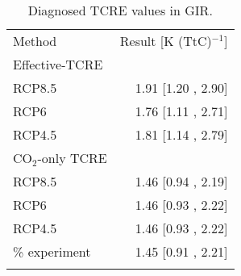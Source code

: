 \documentclass[gmd, manuscript]{copernicus}
\begin{document}
\begin{table}[t]
    \caption{Diagnosed TCRE values in GIR.} \label{tab:TCREresults}
    \begin{tabular}{l r}
    \tophline
        Method & Result [K (TtC)$^{-1}$]\\
    \middlehline
        Effective-TCRE & \\
        RCP8.5 & 1.91 [1.20 , 2.90]\\
        RCP6 & 1.76 [1.11 , 2.71]\\
        RCP4.5 & 1.81 [1.14 , 2.79]\\
    \middlehline
        CO$_2$-only TCRE & \\
        RCP8.5 & 1.46 [0.94 , 2.19]\\
        RCP6 & 1.46 [0.93 , 2.22]\\
        RCP4.5 & 1.46 [0.93 , 2.22]\\
    \middlehline
        1\% experiment & 1.45 [0.91 , 2.21]\\
    \bottomhline
    \end{tabular}
    \belowtable{} %
\end{table}
\end{document}
